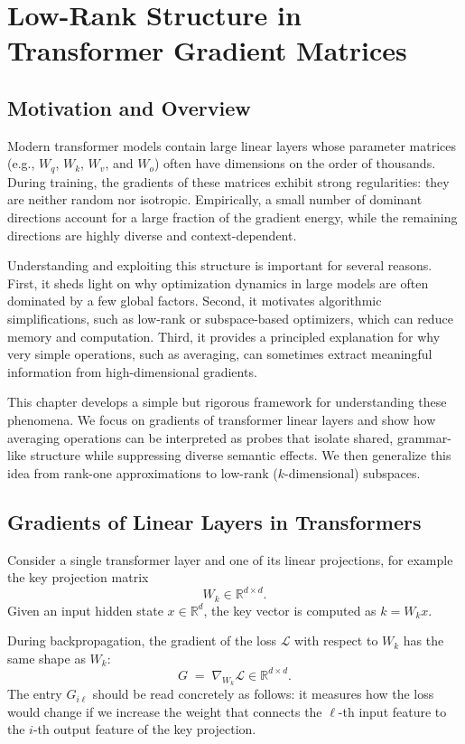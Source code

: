 \documentclass[11pt]{book}
\begin{document}
\chapter{Low-Rank Structure in Transformer Gradient Matrices}

\section{Motivation and Overview}

Modern transformer models contain large linear layers whose parameter matrices
(e.g., $W_q$, $W_k$, $W_v$, and $W_o$) often have dimensions on the order of thousands.
During training, the gradients of these matrices exhibit strong regularities:
they are neither random nor isotropic.
Empirically, a small number of dominant directions account for a large fraction
of the gradient energy, while the remaining directions are highly diverse and
context-dependent.

Understanding and exploiting this structure is important for several reasons.
First, it sheds light on why optimization dynamics in large models are often
dominated by a few global factors.
Second, it motivates algorithmic simplifications, such as low-rank or
subspace-based optimizers, which can reduce memory and computation.
Third, it provides a principled explanation for why very simple operations,
such as averaging, can sometimes extract meaningful information from high-dimensional
gradients.

This chapter develops a simple but rigorous framework for understanding these
phenomena. We focus on gradients of transformer linear layers and show how
averaging operations can be interpreted as probes that isolate shared,
grammar-like structure while suppressing diverse semantic effects.
We then generalize this idea from rank-one approximations to low-rank
($k$-dimensional) subspaces.

\section{Gradients of Linear Layers in Transformers}

Consider a single transformer layer and one of its linear projections, for example
the key projection matrix
\[
W_k \in \mathbb{R}^{d \times d}.
\]
Given an input hidden state $x \in \mathbb{R}^d$, the key vector is computed as
$k = W_k x$.

During backpropagation, the gradient of the loss $\mathcal{L}$ with respect to $W_k$
has the same shape as $W_k$:
\[
G \;=\; \nabla_{W_k} \mathcal{L} \in \mathbb{R}^{d \times d}.
\]
The entry $G_{i\ell}$ should be read concretely as follows: it measures how the loss
would change if we increase the weight that connects the $\ell$-th input feature
to the $i$-th output feature of the key projection.
\end{document}
